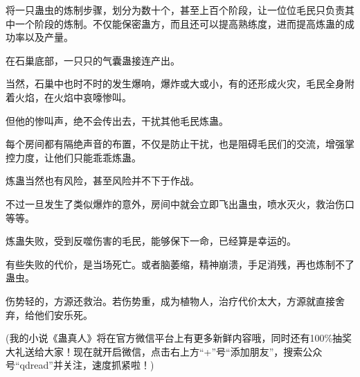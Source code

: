 \begin{this_body}
将一只蛊虫的炼制步骤，划分为数十个，甚至上百个阶段，让一位位毛民只负责其中一个阶段的炼制。不仅能保密蛊方，而且还可以提高熟练度，进而提高炼蛊的成功率以及产量。

在石巢底部，一只只的气囊蛊接连产出。

当然，石巢中也时不时的发生爆响，爆炸或大或小，有的还形成火灾，毛民全身附着火焰，在火焰中哀嚎惨叫。

但他的惨叫声，绝不会传出去，干扰其他毛民炼蛊。

每个房间都有隔绝声音的布置，不仅是防止干扰，也是阻碍毛民们的交流，增强掌控力度，让他们只能乖乖炼蛊。

炼蛊当然也有风险，甚至风险并不下于作战。

不过一旦发生了类似爆炸的意外，房间中就会立即飞出蛊虫，喷水灭火，救治伤口等等。

炼蛊失败，受到反噬伤害的毛民，能够保下一命，已经算是幸运的。

有些失败的代价，是当场死亡。或者脑萎缩，精神崩溃，手足消残，再也炼制不了蛊虫。

伤势轻的，方源还救治。若伤势重，成为植物人，治疗代价太大，方源就直接舍弃，给他们安乐死。

(我的小说《蛊真人》将在官方微信平台上有更多新鲜内容哦，同时还有100\%抽奖大礼送给大家！现在就开启微信，点击右上方“+”号“添加朋友”，搜索公众号“qdread”并关注，速度抓紧啦！)

\end{this_body}

